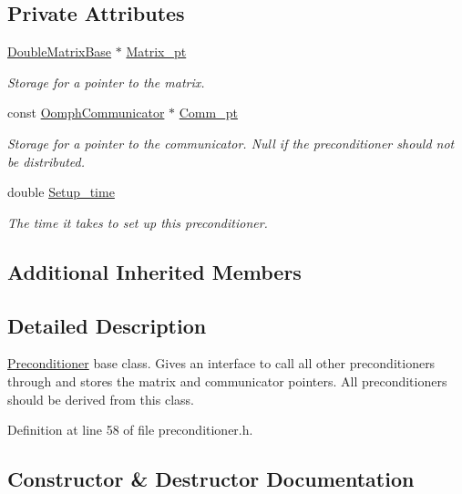 \subsection*{Private Attributes}
\begin{DoxyCompactItemize}
\item 
\hyperlink{classoomph_1_1DoubleMatrixBase}{Double\+Matrix\+Base} $\ast$ \hyperlink{classoomph_1_1Preconditioner_a04caf49de41802ef112e4b8b644b1d4d}{Matrix\+\_\+pt}
\begin{DoxyCompactList}\small\item\em Storage for a pointer to the matrix. \end{DoxyCompactList}\item 
const \hyperlink{classoomph_1_1OomphCommunicator}{Oomph\+Communicator} $\ast$ \hyperlink{classoomph_1_1Preconditioner_aa580eb7cc01ac989201aac30c3a8eab5}{Comm\+\_\+pt}
\begin{DoxyCompactList}\small\item\em Storage for a pointer to the communicator. Null if the preconditioner should not be distributed. \end{DoxyCompactList}\item 
double \hyperlink{classoomph_1_1Preconditioner_a00f5ae98e81e7cb9aa6a70a39a9759c8}{Setup\+\_\+time}
\begin{DoxyCompactList}\small\item\em The time it takes to set up this preconditioner. \end{DoxyCompactList}\end{DoxyCompactItemize}
\subsection*{Additional Inherited Members}


\subsection{Detailed Description}
\hyperlink{classoomph_1_1Preconditioner}{Preconditioner} base class. Gives an interface to call all other preconditioners through and stores the matrix and communicator pointers. All preconditioners should be derived from this class. 

Definition at line 58 of file preconditioner.\+h.



\subsection{Constructor \& Destructor Documentation}
\mbox{\label{classoomph_1_1Preconditioner_a7bd8801e4395ccb88fe1f4296e77e9ab}} 
